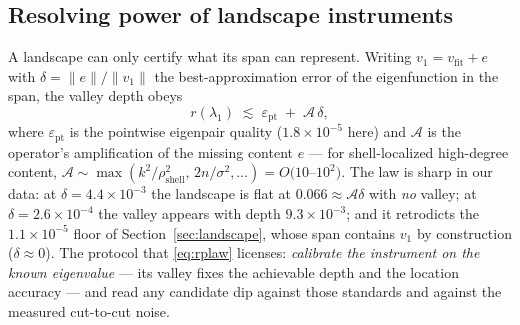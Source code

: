 \documentclass[11pt]{article}
\theoremstyle{plain}
\theoremstyle{remark}
\begin{document}
\subsection{Resolving power of landscape instruments}
\label{sec:resolvingpower}
A landscape can only certify what its span can represent. Writing
$v_1 = v_{\mathrm{fit}} + e$ with $\delta = \|e\|/\|v_1\|$ the
best-approximation error of the eigenfunction in the span, the valley
depth obeys
\begin{equation}\label{eq:rplaw}
r(\lambda_1) \;\lesssim\; \varepsilon_{\mathrm{pt}}
\;+\; \mathcal{A}\,\delta,
\end{equation}
where $\varepsilon_{\mathrm{pt}}$ is the pointwise eigenpair quality
($1.8\times 10^{-5}$ here) and $\mathcal{A}$ is the operator's
amplification of the missing content $e$ --- for shell-localized
high-degree content,
$\mathcal{A} \sim \max(k^2/\rho_{\mathrm{shell}}^2,\,
2n/\sigma^2,\ldots) = O(10$--$10^2)$. The law is sharp in our data:
at $\delta = 4.4\times 10^{-3}$ the landscape is flat at
$0.066 \approx \mathcal{A}\delta$ with \emph{no} valley; at
$\delta = 2.6\times 10^{-4}$ the valley appears with depth
$9.3\times 10^{-3}$; and it retrodicts the
$1.1\times 10^{-5}$ floor of Section~\ref{sec:landscape}, whose span
contains $v_1$ by construction ($\delta \approx 0$). The protocol that
\eqref{eq:rplaw} licenses: \emph{calibrate the instrument on the known
eigenvalue} --- its valley fixes the achievable depth and the location
accuracy --- and read any candidate dip against those standards and
against the measured cut-to-cut noise.
\end{document}
